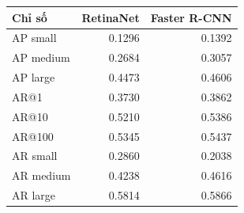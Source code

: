 \begin{tabular}{lrr}
\toprule
Chỉ số & RetinaNet & Faster R-CNN\\
\midrule
AP small & 0.1296 & 0.1392\\
AP medium & 0.2684 & 0.3057\\
AP large & 0.4473 & 0.4606\\
AR@1 & 0.3730 & 0.3862\\
AR@10 & 0.5210 & 0.5386\\
AR@100 & 0.5345 & 0.5437\\
AR small & 0.2860 & 0.2038\\
AR medium & 0.4238 & 0.4616\\
AR large & 0.5814 & 0.5866\\
\bottomrule
\end{tabular}
